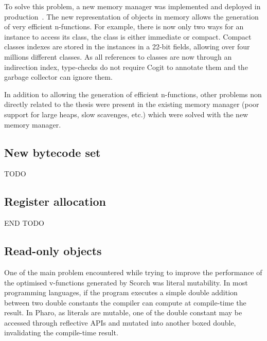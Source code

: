 \documentclass[a4paper,12pt,twoside]{../includes/ThesisStyle}
\begin{document}
To solve this problem, a new memory manager was implemented and deployed in production~\cite{Mir15a}. The new representation of objects in memory allows the generation of very efficient n-functions. For example, there is now only two ways for an instance to access its class, the class is either immediate or compact. Compact classes indexes are stored in the instances in a 22-bit fields, allowing over four millions different classes. As all references to classes are now through an indirection index, type-checks do not require Cogit to annotate them and the garbage collector can ignore them.

In addition to allowing the generation of efficient n-functions, other problems non directly related to the thesis were present in the existing memory manager (poor support for large heaps, slow scavenges, etc.) which were solved with the new memory manager.


\subsection{New bytecode set}

TODO 




\subsection{Register allocation}


END TODO

\subsection{Read-only objects}

One of the main problem encountered while trying to improve the performance of the optimised v-functions generated by Scorch was literal mutability. In most programming languages, if the program executes a simple double addition between two double constants the compiler can compute at compile-time the result. In Pharo, as literals are mutable, one of the double constant may be accessed through reflective APIs and mutated into another boxed double, invalidating the compile-time result. 
\end{document}
